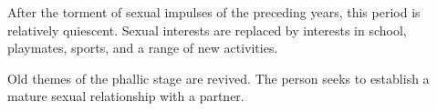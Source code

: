 \begin{coloredlist}
\begin{coloredlist}
\begin{coloredlist}
            \end{coloredlist}
            \item {}
            \begin{coloredlist}
                \item After the torment of sexual impulses of the preceding years, this period is relatively quiescent. Sexual interests are replaced by interests in school, playmates, sports, and a range of new activities. 
            \end{coloredlist}
            \item {}
            \begin{coloredlist}
                \item Old themes of the phallic stage are revived. The person seeks to establish a mature sexual relationship with a partner.
            \end{coloredlist}
        \end{coloredlist}
    \end{coloredlist}